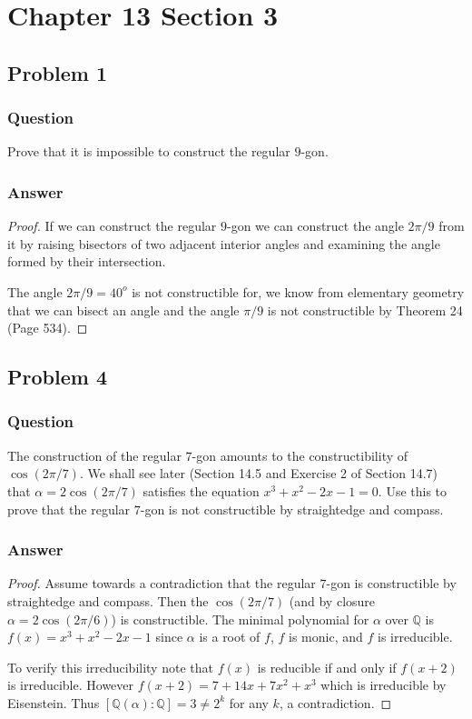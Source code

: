 \documentclass[10pt]{article}
\begin{document}
\section{Chapter 13 Section 3}
\subsection{Problem 1}
\subsubsection{Question}
Prove that it is impossible to construct the regular $9$-gon.
\subsubsection{Answer}
\begin{proof}
If we can construct the regular $9$-gon we can construct the angle $2 \pi / 9$ from it by raising bisectors of two adjacent interior angles and examining the angle formed by their intersection.

The angle $2 \pi / 9 = 40^o$ is not constructible for, we know from elementary geometry that we can bisect an angle and the angle $\pi / 9$ is not constructible by Theorem 24 (Page 534). 
\end{proof}

\subsection{Problem 4}
\subsubsection{Question}
The construction of the regular $7$-gon amounts to the constructibility of $\cos{(2 \pi /7)}$. We shall see later (Section 14.5 and Exercise 2 of Section 14.7) that $\alpha = 2 \cos{(2 \pi /7)}$ satisfies the equation $x^3+x^2-2x -1=0$. Use this to prove that the regular $7$-gon is not constructible by straightedge and compass.
\subsubsection{Answer}
\begin{proof}
Assume towards a contradiction that the regular $7$-gon is constructible by straightedge and compass. Then the $\cos{(2 \pi / 7)}$ (and by closure $\alpha = 2 \cos{(2 \pi /6)}$)  is constructible. The minimal polynomial for $\alpha$ over $\mathbb{Q}$ is $f(x)=x^3+x^2-2x-1$ since $\alpha$ is a root of $f$, $f$ is monic, and $f$ is irreducible. 

To verify this irreducibility note that $f(x)$ is reducible if and only if $f(x+2)$ is irreducible. However $f(x+2)=7+14 x+7 x^2+x^3$ which is irreducible by Eisenstein. Thus $[\mathbb{Q}(\alpha): \mathbb{Q}]=3 \neq 2^k$ for any $k$, a contradiction.
\end{proof}
\end{document}
